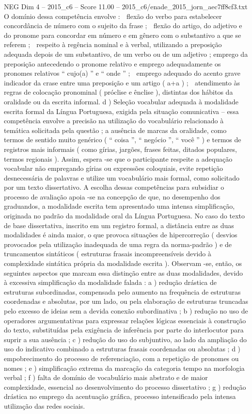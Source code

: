 \begin{textsample}{NEG Dim 4 – 2015\_c6 – Score 11.00 – 2015\_c6/enade\_2015\_jorn\_aec7ff8cf3.txt}
O domínio dessa competência envolve :  flexão do verbo para estabelecer concordância de número com o sujeito da frase ;  flexão do artigo, do adjetivo e do pronome para concordar em número e em gênero com o substantivo a que se referem ;  respeito à regência nominal e à verbal, utilizando a preposição adequada depois de um substantivo, de um verbo ou de um adjetivo ; emprego da preposição antecedendo o pronome relativo e emprego adequadamente os pronomes relativos “ cujo(a) ” e “ onde ” ;  emprego adequado do acento grave indicador da crase entre uma preposição e um artigo ( a+a ) ;  atendimento às regras de colocação pronominal ( próclise e ênclise ), distintas dos hábitos da oralidade ou da escrita informal. d ) Seleção vocabular adequada à modalidade escrita formal da Língua Portuguesa, exigida pela situação comunicativa – essa competência envolve a precisão na utilização do vocabulário relacionado à temática solicitada pela questão ; a ausência de marcas da oralidade, como termos de sentido muito genérico ( “ coisa ”, “ negócio ”, “ você ” ) e termos de registros mais informais ( como gírias, jargões, frases feitas, ditados populares, termos regionais ).
Assim, espera -se que o participante respeite a adequação vocabular não empregando gírias ou expressões coloquiais, evite repetição desnecessária de palavras e utilize um vocabulário mais formal, como solicitado por um texto dissertativo.
A escolha dessas competências para subsidiar o processo de avaliação apoia -se na concepção de que, no desempenho dos graduandos, a modalidade escrita tem apresentado uma intensa simplificação, originada no padrão da modalidade oral da Língua Portuguesa.
No caso do texto de base dissertativa, inscrito em um registro formal, a distância entre as duas modalidades é ainda maior, o que provoca situações de hipercorreção ( desvios provocados pela utilização inadequada de uma regra da norma-padrão ) e de truncamentos sintáticos ( estruturas frasais incompreensíveis devido à complexidade sintática própria da modalidade escrita ).
Observam -se, então, os seguintes aspectos que marcam essa distinção entre as duas modalidades, devido à excessiva simplificação da modalidade falada : a ) redução drástica de estruturas subordinadas, compensada pelo aumento na frequência de estruturas coordenadas e absolutas, por um lado, ou pela elaboração de estruturas truncadas pelo excesso de ideias sem a devida conexão subordinativa ; b ) redução no uso de operadores argumentativas para expressar relações lógicas essenciais à construção do texto, substituídas pela exigência de inferência por parte do interlocutor para suprir a sua ausência ; c ) redução do uso do subjuntivo, ao lado da ampliação do uso do indicativo combinado a estruturas frasais coordenadas ou absolutas ; d ) empobrecimento do processo de referenciação, com a repetição de pronomes ou nomes ; e ) simplificação extrema da marcação da categoria tempo na morfologia verbal ; f ) falta de domínio de vocabulário mais abstrato e de maior complexidade, essencial ao desenvolvimento do processo dissertativo ; g ) redução drástica no emprego da acentuação gráfica, processo intensificado pela intensa utilização das redes sociais.

\end{textsample}
